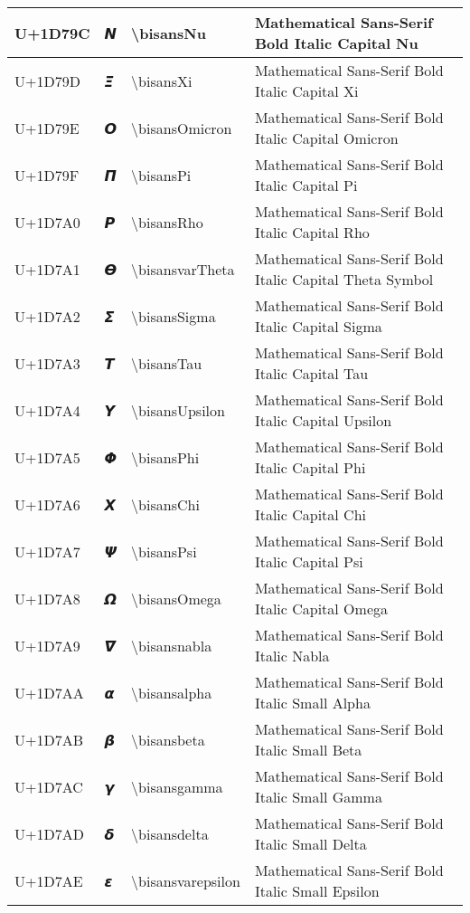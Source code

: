 \begin{table}[h]
\begin{tabulary}{\linewidth}{|L|L|L|L|}
\hline
U+1D79C & 𝞜 & {\textbackslash}bisansNu & Mathematical Sans-Serif Bold Italic Capital Nu \\
\hline
U+1D79D & 𝞝 & {\textbackslash}bisansXi & Mathematical Sans-Serif Bold Italic Capital Xi \\
\hline
U+1D79E & 𝞞 & {\textbackslash}bisansOmicron & Mathematical Sans-Serif Bold Italic Capital Omicron \\
\hline
U+1D79F & 𝞟 & {\textbackslash}bisansPi & Mathematical Sans-Serif Bold Italic Capital Pi \\
\hline
U+1D7A0 & 𝞠 & {\textbackslash}bisansRho & Mathematical Sans-Serif Bold Italic Capital Rho \\
\hline
U+1D7A1 & 𝞡 & {\textbackslash}bisansvarTheta & Mathematical Sans-Serif Bold Italic Capital Theta Symbol \\
\hline
U+1D7A2 & 𝞢 & {\textbackslash}bisansSigma & Mathematical Sans-Serif Bold Italic Capital Sigma \\
\hline
U+1D7A3 & 𝞣 & {\textbackslash}bisansTau & Mathematical Sans-Serif Bold Italic Capital Tau \\
\hline
U+1D7A4 & 𝞤 & {\textbackslash}bisansUpsilon & Mathematical Sans-Serif Bold Italic Capital Upsilon \\
\hline
U+1D7A5 & 𝞥 & {\textbackslash}bisansPhi & Mathematical Sans-Serif Bold Italic Capital Phi \\
\hline
U+1D7A6 & 𝞦 & {\textbackslash}bisansChi & Mathematical Sans-Serif Bold Italic Capital Chi \\
\hline
U+1D7A7 & 𝞧 & {\textbackslash}bisansPsi & Mathematical Sans-Serif Bold Italic Capital Psi \\
\hline
U+1D7A8 & 𝞨 & {\textbackslash}bisansOmega & Mathematical Sans-Serif Bold Italic Capital Omega \\
\hline
U+1D7A9 & 𝞩 & {\textbackslash}bisansnabla & Mathematical Sans-Serif Bold Italic Nabla \\
\hline
U+1D7AA & 𝞪 & {\textbackslash}bisansalpha & Mathematical Sans-Serif Bold Italic Small Alpha \\
\hline
U+1D7AB & 𝞫 & {\textbackslash}bisansbeta & Mathematical Sans-Serif Bold Italic Small Beta \\
\hline
U+1D7AC & 𝞬 & {\textbackslash}bisansgamma & Mathematical Sans-Serif Bold Italic Small Gamma \\
\hline
U+1D7AD & 𝞭 & {\textbackslash}bisansdelta & Mathematical Sans-Serif Bold Italic Small Delta \\
\hline
U+1D7AE & 𝞮 & {\textbackslash}bisansvarepsilon & Mathematical Sans-Serif Bold Italic Small Epsilon \\

\end{tabulary}
\end{table}
